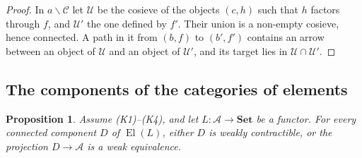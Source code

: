 \documentclass[11pt,a4paper]{article}
\newtheorem{proposition}[theorem]{Proposition}
\theoremstyle{definition}
\newcommand{\El}{\operatorname{El}}
\newcommand{\Set}{\mathbf{Set}}
\begin{document}
\begin{proof}
In $a\backslash\mathcal C$ let $\mathcal U$ be the cosieve of the objects
$(c,h)$ such that $h$ factors through $f$, and $\mathcal U'$ the one defined by
$f'$. Their union is a non-empty cosieve, hence connected. A path in it from
$(b,f)$ to $(b',f')$ contains an arrow between an object of $\mathcal U$ and an
object of $\mathcal U'$, and its target lies in $\mathcal U\cap\mathcal U'$.
\end{proof}

\subsection{The components of the categories of elements}

\begin{proposition}\label{prop:reduction}
Assume \textup{(K1)--(K4)}, and let $L\colon\mathcal A\to\Set$ be a functor. For
every connected component $D$ of $\El(L)$, either $D$ is weakly contractible,
or the projection $D\to\mathcal A$ is a weak equivalence.
\end{proposition}
\end{document}
